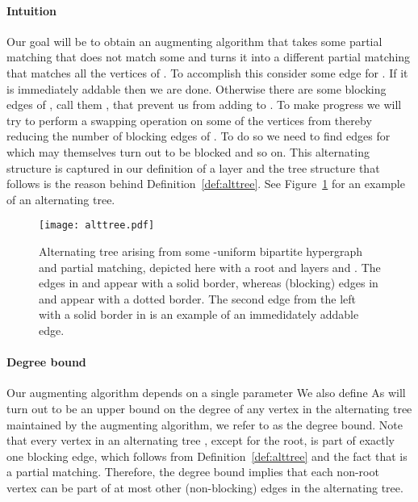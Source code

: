 \documentclass[11pt]{article}
\theoremstyle{definition}
\theoremstyle{remark}
\begin{document}
\paragraph{Intuition} Our goal will be to obtain an augmenting
algorithm that takes some partial matching  that does not match
some  and turns it into a different partial matching 
that matches all the vertices of . To accomplish
this consider some edge  for . If it is immediately
addable then we are done. Otherwise there are some blocking edges of
, call them , that prevent us from adding  to . To make
progress we will try to perform a swapping operation on some of the
vertices from  thereby reducing the number of blocking edges of
. To do so we need to find edges for  which may themselves
turn out to be blocked and so on. This alternating structure is
captured in our definition of a layer and the tree structure that
follows is the reason behind Definition~\ref{def:alttree}. See
Figure~\ref{figure:alttree} for an example of an alternating tree.

\begin{figure}
  \captionsetup{width=0.90\textwidth}
  \centering
  \texttt{[image: alttree.pdf]}
  \caption{Alternating tree arising from some -uniform bipartite
    hypergraph and partial matching, depicted here with a root  and layers  and . The
    edges in  and  appear with a solid border, whereas
    (blocking) edges in  and  appear with a dotted border. The second edge from
the left with a solid border in  is an example of an immedidately addable edge.}
  \label{figure:alttree}
\end{figure}





\paragraph{Degree bound} Our augmenting algorithm
depends on a single parameter
 We also define  As
 will turn out to be an upper bound on the degree of any 
vertex in the alternating tree maintained by the augmenting algorithm,
we refer to  as the degree bound. Note that every  vertex in an
alternating tree , except for the root, is part of exactly one
blocking edge, which follows from Definition~\ref{def:alttree} and the
fact that  is a partial matching. Therefore, the degree bound implies that each non-root
 vertex can be part of at most  other (non-blocking) edges in
the alternating tree.
\end{document}
